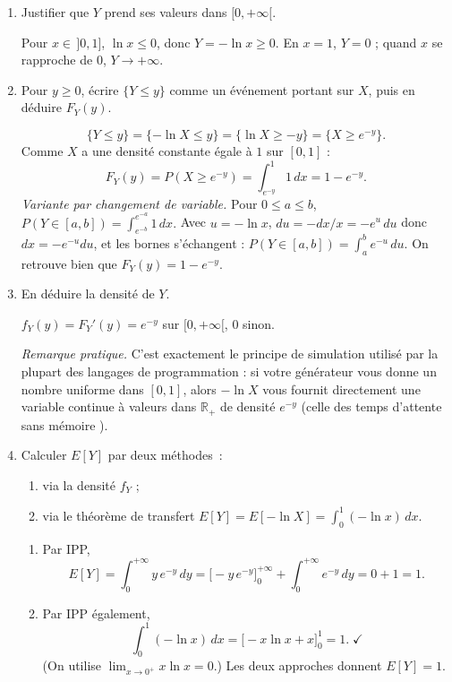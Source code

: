 \begin{enumerate}
  \item Justifier que $Y$ prend ses valeurs dans $[0,+\infty[$.
  \begin{solution}
    Pour $x\in\,]0,1]$, $\ln x\le 0$, donc $Y=-\ln x\ge 0$.
    En $x=1$, $Y=0$ ; quand $x$ se rapproche de $0$, $Y\to +\infty$.
  \end{solution}

  \item Pour $y\ge 0$, écrire $\{Y\le y\}$ comme un événement portant
  sur $X$, puis en déduire $F_Y(y)$.
  \begin{solution}
    \[
      \{Y\le y\}=\{-\ln X\le y\}=\{\ln X\ge -y\}=\{X\ge e^{-y}\}.
    \]
    Comme $X$ a une densité constante égale à $1$ sur $[0,1]$ :
    \[
      F_Y(y)=P(X\ge e^{-y})=\int_{e^{-y}}^{1}1\,dx=1-e^{-y}.
    \]
    \textit{Variante par changement de variable.}
    Pour $0\le a\le b$,
    \(
      P(Y\in[a,b])=\int_{e^{-b}}^{e^{-a}}1\,dx.
    \)
    Avec $u=-\ln x$, $du=-dx/x=-e^{u}\,du$ donc $dx=-e^{-u}du$,
    et les bornes s'échangent :
    \(
      P(Y\in[a,b])=\int_a^b e^{-u}\,du.
    \)
    On retrouve bien que $F_Y(y)=1-e^{-y}$.
  \end{solution}

  \item En déduire la densité de $Y$.
  \begin{solution}
    $f_Y(y)=F_Y'(y)=e^{-y}$ sur $[0,+\infty[$, $0$ sinon.

    \textit{Remarque pratique.}
    C'est exactement le principe de simulation utilisé
    par la plupart des langages de programmation : si votre générateur
    vous donne un nombre uniforme dans $[0,1]$, alors $-\ln X$ vous
    fournit directement une variable continue à valeurs dans
    $\mathbb R_+$ de densité $e^{-y}$ (celle des temps d'attente
    \og sans mémoire \fg).
  \end{solution}

  \item Calculer $E[Y]$ par deux méthodes~:
  \begin{enumerate}
    \item via la densité $f_Y$ ;
    \item via le théorème de transfert
    $E[Y]=E[-\ln X]=\int_0^1(-\ln x)\,dx$.
  \end{enumerate}
  \begin{solution}
    \begin{enumerate}
    \item Par IPP,
    \[
      E[Y]=\int_0^{+\infty}y\,e^{-y}\,dy
      =\bigl[-y\,e^{-y}\bigr]_0^{+\infty}+\int_0^{+\infty}e^{-y}\,dy
      =0+1=1.
    \]

    \item Par IPP également,
    \[
      \int_0^1(-\ln x)\,dx
      =\bigl[-x\ln x+x\bigr]_0^1=1.\;\checkmark
    \]
    (On utilise $\lim_{x\to 0^+}x\ln x=0$.)
    Les deux approches donnent $E[Y]=1$.
    \end{enumerate}
  \end{solution}
\end{enumerate}
\newpage 

